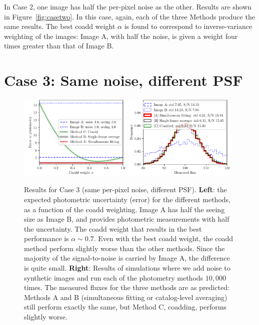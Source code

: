\documentclass[letter,11pt]{article}
\begin{document}
In Case 2, one image has half the per-pixel noise as the other.
Results are shown in Figure~\ref{fig:casetwo}.  In this case, again,
each of the three Methods produce the same results.  The best coadd
weight $\alpha$ is found to correspond to inverse-variance weighting
of the images: Image A, with half the noise, is given a weight four
times greater than that of Image B.

\newpage

\section*{Case 3: Same noise, different PSF}

\begin{figure}[b!]
  \begin{center}
    \includegraphics[width=0.48\textwidth]{coadd-04}
    \includegraphics[width=0.48\textwidth]{coadd-05}
  \end{center}
  \caption{Results for Case 3 (same per-pixel noise, different PSF).
    \textbf{Left}: the expected photometric uncertainty (error) for
    the different methods, as a function of the coadd weighting.
    Image A has half the seeing size as Image B, and provides
    photometric measurements with half the uncertainty.  The coadd
    weight that results in the best performance is $\alpha \sim 0.7$.
    Even with the best coadd weight, the coadd method perform slightly
    worse than the other methods.  Since the majority of the
    signal-to-noise is carried by Image A, the difference is quite
    small.
    \newline \textbf{Right}: Results of simulations where we add noise
    to synthetic images and run each of the photometry methods
    $10,000$ times.  The measured fluxes for the three methods are as
    predicted: Methods A and B (simultaneous fitting or catalog-level
    averaging) still perform exactly the same, but Method C, coadding,
    performs slightly worse.
    \label{fig:casethree}}
\end{figure}
\end{document}
